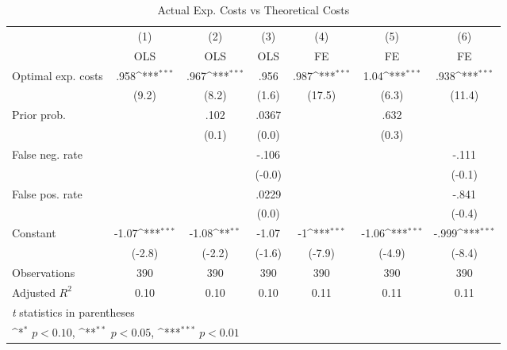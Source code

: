 \begin{table}[htbp]\centering
\def\sym#1{\ifmmode^{#1}\else\(^{#1}\)\fi}
\caption{Actual Exp. Costs vs Theoretical Costs}
\begin{tabular}{l*{6}{c}}
\hline\hline
                &\multicolumn{1}{c}{(1)}&\multicolumn{1}{c}{(2)}&\multicolumn{1}{c}{(3)}&\multicolumn{1}{c}{(4)}&\multicolumn{1}{c}{(5)}&\multicolumn{1}{c}{(6)}\\
                &\multicolumn{1}{c}{OLS}&\multicolumn{1}{c}{OLS}&\multicolumn{1}{c}{OLS}&\multicolumn{1}{c}{FE}&\multicolumn{1}{c}{FE}&\multicolumn{1}{c}{FE}\\
\hline
Optimal exp. costs&     .958\sym{***}&     .967\sym{***}&     .956         &     .987\sym{***}&     1.04\sym{***}&     .938\sym{***}\\
                &    (9.2)         &    (8.2)         &    (1.6)         &   (17.5)         &    (6.3)         &   (11.4)         \\
Prior prob.     &                  &     .102         &    .0367         &                  &     .632         &                  \\
                &                  &    (0.1)         &    (0.0)         &                  &    (0.3)         &                  \\
False neg. rate &                  &                  &    -.106         &                  &                  &    -.111         \\
                &                  &                  &   (-0.0)         &                  &                  &   (-0.1)         \\
False pos. rate &                  &                  &    .0229         &                  &                  &    -.841         \\
                &                  &                  &    (0.0)         &                  &                  &   (-0.4)         \\
Constant        &    -1.07\sym{***}&    -1.08\sym{**} &    -1.07         &       -1\sym{***}&    -1.06\sym{***}&    -.999\sym{***}\\
                &   (-2.8)         &   (-2.2)         &   (-1.6)         &   (-7.9)         &   (-4.9)         &   (-8.4)         \\
\hline
Observations    &      390         &      390         &      390         &      390         &      390         &      390         \\
Adjusted \(R^{2}\)&     0.10         &     0.10         &     0.10         &     0.11         &     0.11         &     0.11         \\
\hline\hline
\multicolumn{7}{l}{\footnotesize \textit{t} statistics in parentheses}\\
\multicolumn{7}{l}{\footnotesize \sym{*} \(p<0.10\), \sym{**} \(p<0.05\), \sym{***} \(p<0.01\)}\\
\end{tabular}
\end{table}

